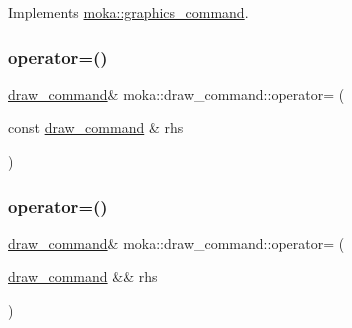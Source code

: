 Implements \mbox{\hyperlink{classmoka_1_1graphics__command_a7affaeceb1019ab358c62185bce4e654}{moka\+::graphics\+\_\+command}}.

\mbox{\label{classmoka_1_1draw__command_af468f0d21fdd5b28d5ee583dfccdc737}} 
\subsubsection{\texorpdfstring{operator=()}{operator=()}\hspace{0.1cm}{\footnotesize\ttfamily [1/2]}}
{\footnotesize\ttfamily \mbox{\hyperlink{classmoka_1_1draw__command}{draw\+\_\+command}}\& moka\+::draw\+\_\+command\+::operator= (\begin{DoxyParamCaption}\item[{const \mbox{\hyperlink{classmoka_1_1draw__command}{draw\+\_\+command}} \&}]{rhs }\end{DoxyParamCaption})}

\mbox{\label{classmoka_1_1draw__command_ac0bc4736f13b8a2d378151399d7fa9ea}} 
\subsubsection{\texorpdfstring{operator=()}{operator=()}\hspace{0.1cm}{\footnotesize\ttfamily [2/2]}}
{\footnotesize\ttfamily \mbox{\hyperlink{classmoka_1_1draw__command}{draw\+\_\+command}}\& moka\+::draw\+\_\+command\+::operator= (\begin{DoxyParamCaption}\item[{\mbox{\hyperlink{classmoka_1_1draw__command}{draw\+\_\+command}} \&\&}]{rhs }\end{DoxyParamCaption})\hspace{0.3cm}{\ttfamily [noexcept]}}

\mbox{\label{classmoka_1_1draw__command_af187f2784c712a95171f8089ebc33500}} 
